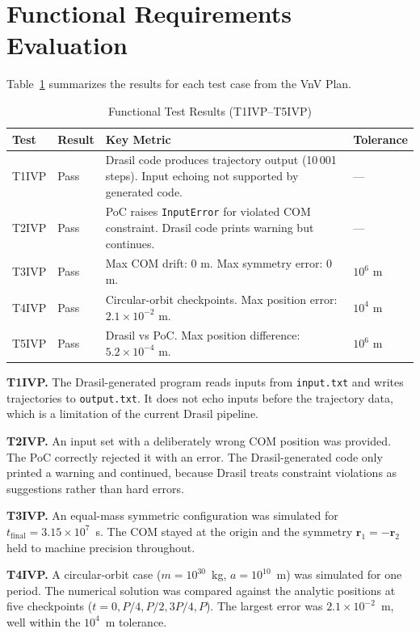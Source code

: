 \documentclass[12pt, titlepage]{article}
\begin{document}
\section{Functional Requirements Evaluation}\label{sec:func}

Table~\ref{tab:func-results} summarizes the results for each test case from the
VnV Plan.

\begin{table}[h!]
\centering
\renewcommand{\arraystretch}{1.3}
\begin{tabularx}{\textwidth}{|p{1.2cm}|p{1.2cm}|X|p{2.2cm}|}
\hline
\textbf{Test} & \textbf{Result} & \textbf{Key Metric} & \textbf{Tolerance} \\
\hline
T1IVP & Pass &
  Drasil code produces trajectory output (10\,001 steps).
  Input echoing not supported by generated code. &
  --- \\
\hline
T2IVP & Pass &
  PoC raises \texttt{InputError} for violated COM constraint.
  Drasil code prints warning but continues. &
  --- \\
\hline
T3IVP & Pass &
  Max COM drift: $0$ m. Max symmetry error: $0$ m. &
  $10^{6}$ m \\
\hline
T4IVP & Pass &
  Circular-orbit checkpoints. Max position error: $2.1\times10^{-2}$ m. &
  $10^{4}$ m \\
\hline
T5IVP & Pass &
  Drasil vs PoC. Max position difference: $5.2\times10^{-4}$ m. &
  $10^{6}$ m \\
\hline
\end{tabularx}
\caption{Functional Test Results (T1IVP--T5IVP)}
\label{tab:func-results}
\end{table}

\textbf{T1IVP.}
The Drasil-generated program reads inputs from \texttt{input.txt} and writes
trajectories to \texttt{output.txt}. It does not echo inputs before the
trajectory data, which is a limitation of the current Drasil pipeline.

\textbf{T2IVP.}
An input set with a deliberately wrong COM position was provided. The PoC
correctly rejected it with an error. The Drasil-generated code only printed a
warning and continued, because Drasil treats constraint violations as
suggestions rather than hard errors.

\textbf{T3IVP.}
An equal-mass symmetric configuration was simulated for
$t_{\text{final}}=3.15\times10^{7}$~s. The COM stayed at the origin and the
symmetry $\mathbf{r}_1=-\mathbf{r}_2$ held to machine precision throughout.

\textbf{T4IVP.}
A circular-orbit case ($m=10^{30}$~kg, $a=10^{10}$~m) was simulated for one
period. The numerical solution was compared against the analytic positions at
five checkpoints ($t=0, P/4, P/2, 3P/4, P$). The largest error was
$2.1\times10^{-2}$~m, well within the $10^{4}$~m tolerance.
\end{document}
